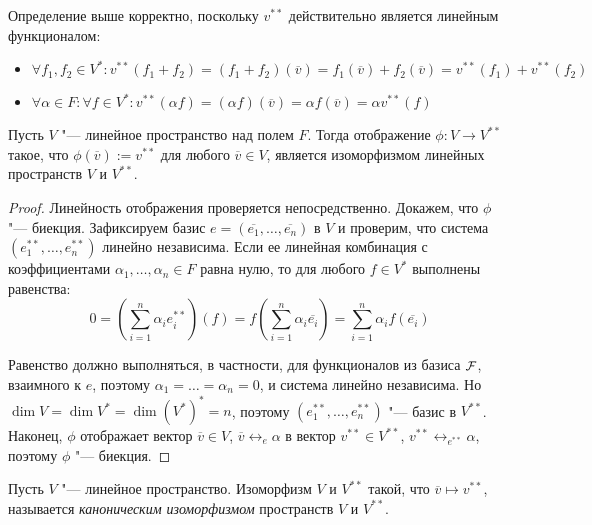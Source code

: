     \begin{note}
    	Определение выше корректно, поскольку $v^{**}$ действительно является линейным функционалом:
    	\begin{itemize}
    		\item $\forall f_1, f_2 \in V^*: v^{**}(f_1 + f_2) = (f_1 + f_2)(\overline{v}) = f_1(\overline{v}) + f_2(\overline{v}) = v^{**}(f_1) + v^{**}(f_2)$
    		\item $\forall \alpha \in F: \forall f \in V^*: v^{**}(\alpha f) = (\alpha f)(\overline{v}) = \alpha f(\overline{v}) = \alpha v^{**}(f)$
    	\end{itemize}
    \end{note}
    
    \begin{theorem}
    	Пусть $V$ "--- линейное пространство над полем $F$. Тогда отображение $\phi: V \rightarrow V^{**}$ такое, что $\phi(\overline{v}) := v^{**}$ для любого $\overline v \in V$, является изоморфизмом линейных пространств $V$ и $V^{**}$.
    \end{theorem}
    
    \begin{proof}
    	Линейность отображения проверяется непосредственно. Докажем, что $\phi$ "--- биекция. Зафиксируем базис $e = (\overline{e_1}, \dots, \overline{e_n})$ в $V$ и проверим, что система $(e_1^{**}, \dots, e_n^{**})$ линейно независима. Если ее линейная комбинация с коэффициентами $\alpha_1, \dotsc, \alpha_n \in F$ равна нулю, то для любого $f \in V^*$ выполнены равенства:
    	\[0 = \left(\sum_{i = 1}^{n}\alpha_ie_i^{**}\right)(f) = f\left(\sum_{i = 1}^n\alpha_i\overline{e_i}\right) = \sum_{i = 1}^n\alpha_if(\overline{e_i})\]
    	
    	Равенство должно выполняться, в частности, для функционалов из базиса $\FF $, взаимного к $e$, поэтому $\alpha_1 = \dots = \alpha_n = 0$, и система линейно независима. Но $\dim{V} = \dim{V^*} = \dim{(V^*)^*} = n$, поэтому $(e_1^{**}, \dots, e_n^{**})$ "--- базис в $V^{**}$. Наконец, $\phi$ отображает вектор $\overline{v} \in V$, $\overline{v} \leftrightarrow_{e} \alpha$ в вектор $v^{**} \in V^{**}$, $v^{**} \leftrightarrow_{e^{**}} \alpha$, поэтому $\phi$ "--- биекция.
    \end{proof}
    
    \begin{definition}
    	Пусть $V$ "--- линейное пространство. Изоморфизм $V$ и $V^{**}$ такой, что $\overline{v} \mapsto v^{**}$, называется \textit{каноническим изоморфизмом} пространств $V$ и $V^{**}$.
    \end{definition}
    

